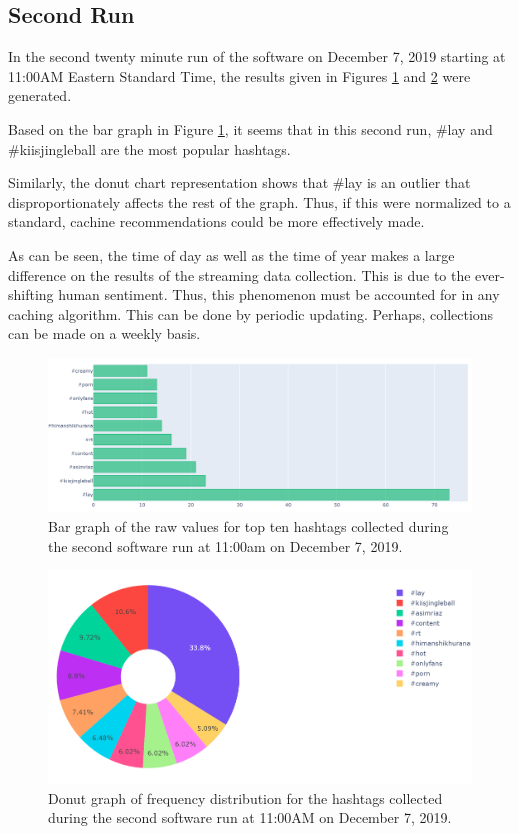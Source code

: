 \documentclass[conference]{IEEEtran}
\begin{document}
\subsection{Second Run}
In the second twenty minute run of the software on December 7, 2019 starting at 11:00AM Eastern Standard Time, the results given in Figures \ref{fig:bar_run2} and \ref{fig:donut_run2} were generated.

Based on the bar graph in Figure \ref{fig:bar_run2}, it seems that in this second run, \#lay and \#kiisjingleball are the most popular hashtags. \par

Similarly, the donut chart representation shows that \#lay is an outlier that disproportionately affects the rest of the graph. Thus, if this were normalized to a standard, cachine recommendations could be more effectively made. \par

As can be seen, the time of day as well as the time of year makes a large difference on the results of the streaming data collection. This is due to the ever-shifting human sentiment. Thus, this phenomenon must be accounted for in any caching algorithm. This can be done by periodic updating. Perhaps, collections can be made on a weekly basis. \par

\begin{figure}
    \hspace*{0cm}
    \includegraphics[scale=0.35]{img/bar_run2.PNG}
    \caption{Bar graph of the raw values for top ten hashtags collected during the second software run at 11:00am on December 7, 2019.}
    \label{fig:bar_run2}
\end{figure}

\begin{figure}
    \hspace*{0cm}
    \includegraphics[scale=0.45]{img/donut_run2.PNG}
    \caption{Donut graph of frequency distribution for the hashtags collected during the second software run at 11:00AM on December 7, 2019.}
    \label{fig:donut_run2}
\end{figure}
\end{document}
